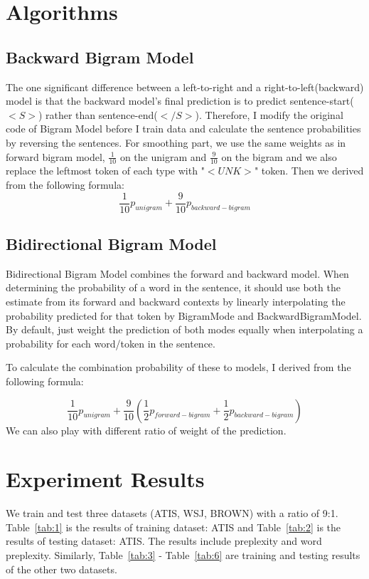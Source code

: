 \documentclass[journal, a4paper]{IEEEtran}
\begin{document}
\section{Algorithms}\label{algorithm}
\vspace{3mm}
\subsection{Backward Bigram Model}
The one significant difference between a left-to-right and a right-to-left(backward) model is that the backward model's final prediction is to predict sentence-start($<S>$) rather than sentence-end($</S>$). Therefore, I modify the original code of Bigram Model before I train data and calculate the sentence probabilities by reversing the sentences. For smoothing part, we use the same weights as in forward bigram model, $\frac{1}{10}$ on the unigram and $\frac{9}{10}$ on the bigram and we also replace the leftmost token of each type with "$<UNK>$" token. Then we derived from the following formula:
\[
  \frac{1}{10}p_{unigram} + \frac{9}{10}p_{backward-bigram}
\]


\subsection{Bidirectional Bigram Model}
Bidirectional Bigram Model combines the forward and backward model. When determining the probability of a word in the sentence, it should use both the estimate from its forward and backward contexts by linearly interpolating the probability predicted for that token by BigramMode and BackwardBigramModel. By default, just weight the prediction of both modes equally when interpolating a probability for each word/token in the sentence.~\cite{HOP96}

To calculate the combination probability of these to models, I derived from the following formula:

\[
  \frac{1}{10}p_{unigram} + \frac{9}{10}\left(\frac{1}{2}p_{forward-bigram} + \frac{1}{2}p_{backward-bigram}\right)
\]
We can also play with different ratio of weight of the prediction.

\section{Experiment Results}\label{result}

We train and test three datasets (ATIS, WSJ, BROWN) with a ratio of 9:1. Table~\ref{tab:1} is the results of training dataset: ATIS and Table~\ref{tab:2} is the results of testing dataset: ATIS. The results include preplexity and word preplexity. Similarly,  Table~\ref{tab:3} - Table~\ref{tab:6} are training and testing results of the other two datasets.
\end{document}
